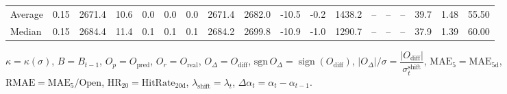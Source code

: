 \begin{threeparttable}
{\begin{tabular}{lrrrrrrrrrrrrrrrrr}
Average &     0.15 & 2671.4 &              10.6 &               0.0 &                0.0 &                0.0 & 2671.4 & 2682.0 &      -10.5 &                     -0.2 &              1438.2 &         -- &        -- &             -- &             39.7 &            1.48 &                  55.50 \\
 Median &     0.15 & 2684.4 &              11.4 &               0.1 &                0.1 &                0.1 & 2684.2 & 2699.8 &      -10.9 &                     -1.0 &              1290.7 &         -- &        -- &             -- &             37.9 &            1.39 &                  60.00 \\
\bottomrule
\end{tabular}
}
\begin{tablenotes}\footnotesize
\item $\kappa=\kappa(\sigma)$, $B=B_{t-1}$, $O_p=O_{\text{pred}}$, $O_r=O_{\text{real}}$, $O_\Delta=O_{\text{diff}}$, $\mathrm{sgn}\,O_\Delta=\operatorname{sign}(O_{\text{diff}})$, $|O_\Delta|/\sigma=\dfrac{|O_{\text{diff}}|}{\sigma_t^{\text{shift}}}$, $\mathrm{MAE}_5=\mathrm{MAE}_{5\text{d}}$, $\mathrm{RMAE}= \mathrm{MAE}_5 / \text{Open}$, $\mathrm{HR}_{20}=\mathrm{HitRate}_{20\text{d}}$, 
$\lambda_{\text{shift}}=\lambda_t$, 
$\Delta\alpha_t=\alpha_t-\alpha_{t-1}$.
\end{tablenotes}
\end{threeparttable}
\endgroup

